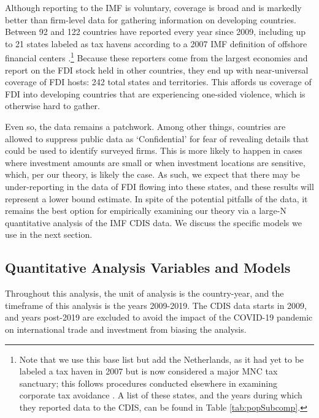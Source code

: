 \documentclass[11pt, titlepage]{article} %
\begin{document}
Although reporting to the IMF is voluntary, coverage is broad and is markedly better than firm-level data for gathering information on developing countries. Between 92 and 122 countries have reported every year since 2009, including up to 21 states labeled as tax havens according to a 2007 IMF definition of offshore financial centers \parencite{zoromeConceptOffshoreFinancial2007}.\footnote{Note that we use this base list but add the Netherlands, as it had yet to be labeled a tax haven in 2007 but is now considered a major MNC tax sanctuary; this follows procedures conducted elsewhere in examining corporate tax avoidance \parencite{torslovMissingProfitsNations2023}. A list of these states, and the years during which they reported data to the CDIS, can be found in Table \ref{tab:popSubcomp}.} Because these reporters come from the largest economies and report on the FDI stock held in other countries, they end up with near-universal coverage of FDI hosts: 242 total states and territories. This affords us coverage of FDI into developing countries that are experiencing one-sided violence, which is otherwise hard to gather. 

Even so, the data remains a patchwork. Among other things, countries are allowed to suppress public data as `Confidential' for fear of revealing details that could be used to identify surveyed firms. This is more likely to happen in cases where investment amounts are small or when investment locations are sensitive, which, per our theory, is likely the case. As such, we expect that there may be under-reporting in the data of FDI flowing into these states, and these results will represent a lower bound estimate. In spite of the potential pitfalls of the data, it remains the best option for empirically examining our theory via a large-N quantitative analysis of the IMF CDIS data. We discuss the specific models we use in the next section.  

\subsection*{Quantitative Analysis Variables and Models}

Throughout this analysis, the unit of analysis is the country-year, and the timeframe of this analysis is the years 2009-2019. The CDIS data starts in 2009, and years post-2019 are excluded to avoid the impact of the COVID-19 pandemic on international trade and investment from biasing the analysis. 
\end{document}
